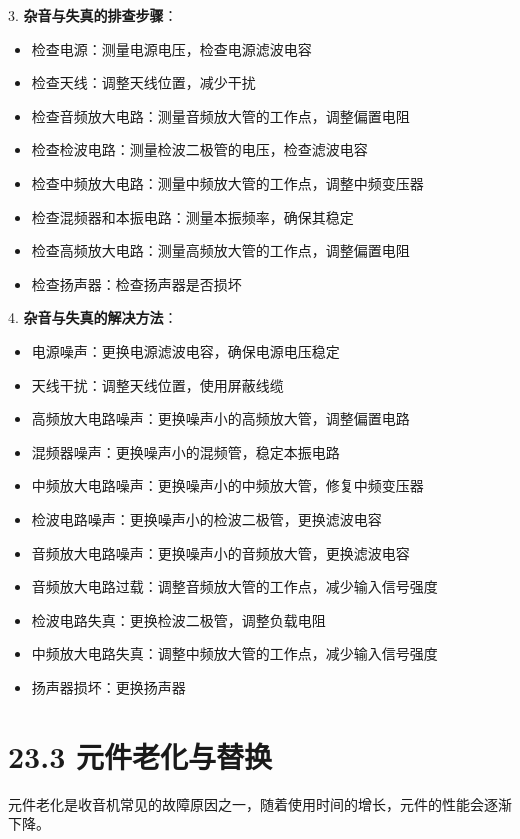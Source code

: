 \documentclass[12pt,UTF8]{ctexbook}
\begin{document}
3. \textbf{杂音与失真的排查步骤}：
   \begin{itemize}[leftmargin=3.5em]
   \item 检查电源：测量电源电压，检查电源滤波电容
   \item 检查天线：调整天线位置，减少干扰
   \item 检查音频放大电路：测量音频放大管的工作点，调整偏置电阻
   \item 检查检波电路：测量检波二极管的电压，检查滤波电容
   \item 检查中频放大电路：测量中频放大管的工作点，调整中频变压器
   \item 检查混频器和本振电路：测量本振频率，确保其稳定
   \item 检查高频放大电路：测量高频放大管的工作点，调整偏置电阻
   \item 检查扬声器：检查扬声器是否损坏
   \end{itemize}

4. \textbf{杂音与失真的解决方法}：
   \begin{itemize}[leftmargin=3.5em]
   \item 电源噪声：更换电源滤波电容，确保电源电压稳定
   \item 天线干扰：调整天线位置，使用屏蔽线缆
   \item 高频放大电路噪声：更换噪声小的高频放大管，调整偏置电路
   \item 混频器噪声：更换噪声小的混频管，稳定本振电路
   \item 中频放大电路噪声：更换噪声小的中频放大管，修复中频变压器
   \item 检波电路噪声：更换噪声小的检波二极管，更换滤波电容
   \item 音频放大电路噪声：更换噪声小的音频放大管，更换滤波电容
   \item 音频放大电路过载：调整音频放大管的工作点，减少输入信号强度
   \item 检波电路失真：更换检波二极管，调整负载电阻
   \item 中频放大电路失真：调整中频放大管的工作点，减少输入信号强度
   \item 扬声器损坏：更换扬声器
   \end{itemize}

\section*{23.3 元件老化与替换}

元件老化是收音机常见的故障原因之一，随着使用时间的增长，元件的性能会逐渐下降。
\end{document}
